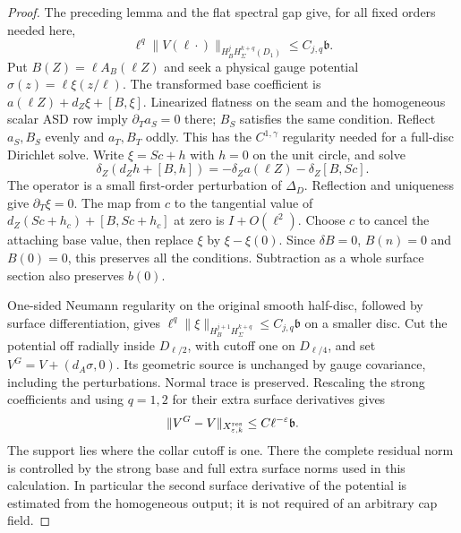 \documentclass[11pt]{amsart}
\theoremstyle{definition}
\theoremstyle{remark}
\theoremstyle{plain}
\begin{document}
\begin{proof}
The preceding lemma and the flat spectral gap give, for all fixed
orders needed here,
\[
        \ell^q\|V(\ell\cdot)\|_{H_B^jH^{k+q}_\Sigma(D_1)}
                                                   \leq C_{j,q}\mathfrak b.
\]
Put $B(Z)=\ell A_B(\ell Z)$ and seek a physical gauge potential
$\sigma(z)=\ell\xi(z/\ell)$. The transformed base coefficient
is $a(\ell Z)+d_Z\xi+[B,\xi]$. Linearized flatness on the
seam and the homogeneous scalar ASD row imply
$\partial_Ta_S=0$ there; $B_S$ satisfies the same condition.
Reflect $a_S,B_S$ evenly and $a_T,B_T$ oddly. This has the
$C^{1,\gamma}$ regularity needed for a full-disc Dirichlet solve.
Write $\xi=Sc+h$ with $h=0$ on the unit circle, and solve
\[
 \delta_Z(d_Zh+[B,h])=-\delta_Za(\ell Z)-\delta_Z[B,Sc].
\]
The operator is a small first-order perturbation of $\Delta_D$.
Reflection and uniqueness give $\partial_T\xi=0$. The map
from $c$ to the tangential value of
$d_Z(Sc+h_c)+[B,Sc+h_c]$ at zero is $I+O(\ell^2)$.
Choose $c$ to cancel the attaching base value, then replace
$\xi$ by $\xi-\xi(0)$. Since $\delta B=0$, $B(n)=0$ and
$B(0)=0$, this preserves all the conditions. Subtraction as a
whole surface section also preserves $b(0)$.

One-sided Neumann regularity on the original smooth half-disc,
followed by surface differentiation, gives
$\ell^q\|\xi\|_{H_B^{j+1}H^{k+q}_\Sigma}\leq C_{j,q}\mathfrak b$
on a smaller disc. Cut the potential off radially inside $D_{\ell/2}$,
with cutoff one on $D_{\ell/4}$, and set
$V^G=V+(d_A\sigma,0)$. Its geometric source is unchanged by
gauge covariance, including the perturbations. Normal trace is
preserved. Rescaling the strong coefficients and using $q=1,2$
for their extra surface derivatives gives
\begin{equation}\label{eq:gluing-residual-gauge-bound}
 \|V^G-V\|_{X^{\rm res}_{\varepsilon,k}}
                                        \leq C\ell^{-\varepsilon}\mathfrak b.
\end{equation}
The support lies where the collar cutoff is one. There the complete
residual norm is controlled by the strong base and full extra surface
norms used in this calculation. In particular the second surface
derivative of the potential is estimated from the homogeneous output;
it is not required of an arbitrary cap field.


\end{proof}
\end{document}
